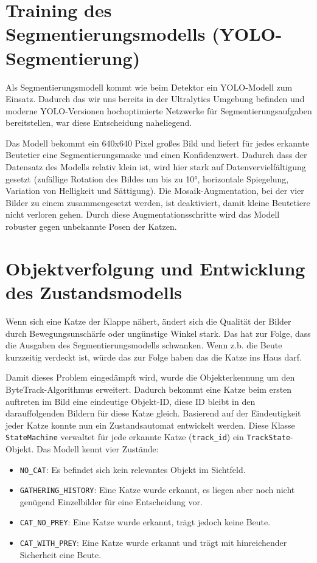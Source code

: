 \section{Training des Segmentierungsmodells (YOLO-Segmentierung)}
Als Segmentierungsmodell kommt wie beim Detektor ein YOLO-Modell zum Einsatz. Dadurch das wir uns bereits in der Ultralytics Umgebung befinden und moderne YOLO-Versionen hochoptimierte Netzwerke für Segmentierungsaufgaben bereitstellen, war diese Entscheidung naheliegend.

Das Modell bekommt ein 640x640 Pixel großes Bild und liefert für jedes erkannte Beutetier eine Segmentierungsmaske und einen Konfidenzwert. Dadurch dass der Datensatz des Modells relativ klein ist, wird hier stark auf Datenvervielfältigung gesetzt (zufällige Rotation des Bildes um bis zu 10°, horizontale Spiegelung, Variation von Helligkeit und Sättigung). Die Mosaik-Augmentation, bei der vier Bilder zu einem zusammengesetzt werden, ist deaktiviert, damit kleine Beutetiere nicht verloren gehen. Durch diese Augmentationsschritte wird das Modell robuster gegen unbekannte Posen der Katzen. 

\section{Objektverfolgung und Entwicklung des Zustandsmodells}
\label{sec:methodik_zustand}
Wenn sich eine Katze der Klappe nähert, ändert sich die Qualität der Bilder durch Bewegungsunschärfe oder ungünstige Winkel stark. Das hat zur Folge, dass die Ausgaben des Segmentierungsmodells schwanken. Wenn z.b. die Beute kurzzeitig verdeckt ist, würde das zur Folge haben das die Katze ins Haus darf. 

Damit dieses Problem eingedämpft wird, wurde die Objekterkennung um den ByteTrack-Algorithmus erweitert. Dadurch bekommt eine Katze beim ersten auftreten im Bild eine eindeutige Objekt-ID, diese ID bleibt in den darauffolgenden Bildern für diese Katze gleich. Basierend auf der Eindeutigkeit jeder Katze konnte nun ein Zustandsautomat entwickelt werden. Diese Klasse \texttt{StateMachine} verwaltet für jede erkannte Katze (\texttt{track\_id}) ein \texttt{TrackState}-Objekt. Das Modell kennt vier Zustände:

\begin{itemize}
    \item \texttt{NO\_CAT}: Es befindet sich kein relevantes Objekt im Sichtfeld.
    \item \texttt{GATHERING\_HISTORY}: Eine Katze wurde erkannt, es liegen aber noch nicht genügend Einzelbilder für eine Entscheidung vor.
    \item \texttt{CAT\_NO\_PREY}: Eine Katze wurde erkannt, trägt jedoch keine Beute.
    \item \texttt{CAT\_WITH\_PREY}: Eine Katze wurde erkannt und trägt mit hinreichender Sicherheit eine Beute.
\end{itemize}


